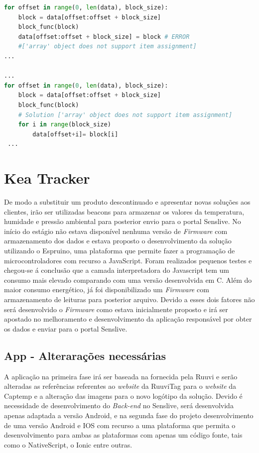 \begin{lstlisting}[caption=Adapatação do Código para o equipamento Digi,label={py2},language=Python]
for offset in range(0, len(data), block_size):
    block = data[offset:offset + block_size]
    block_func(block)
    data[offset:offset + block_size] = block # ERROR 
    #['array' object does not support item assignment]
...

...
for offset in range(0, len(data), block_size):
    block = data[offset:offset + block_size]
    block_func(block)
    # Solution ['array' object does not support item assignment]
    for i in range(block_size)
        data[offset+i]= block[i]
 ...
\end{lstlisting}

\section {Kea Tracker}

\par De modo a substituir um produto descontinuado e apresentar novas soluções aos clientes, irão ser utilizadas beacons para armazenar os valores da temperatura, humidade e pressão ambiental para posterior envio para o portal Senslive. No início do estágio não estava disponível nenhuma versão de \textit{Firmware} com armazenamento dos dados e estava proposto o desenvolvimento da solução utilizando o Espruino, uma plataforma que permite fazer a programação de microcontroladores com recurso a JavaScript. Foram realizados pequenos testes e chegou-se á conclusão que a camada interpretadora do Javascript tem um consumo mais elevado comparando com uma versão desenvolvida em C. Além do maior consumo energético, já foi disponibilizado um \textit{Firmware} com armazenamento de leituras para posterior arquivo. Devido a esses dois fatores não será desenvolvido o \textit{Firmware} como estava inicialmente proposto e irá ser apostado no melhoramento e desenvolvimento da aplicação responsável por obter os dados e enviar para o portal Senslive. 


\subsection{App - Alterarações necessárias}

\par A aplicação na primeira fase irá ser baseada na fornecida pela Ruuvi e serão alteradas as referências referentes ao \textit{website} da RuuviTag para o \textit{website} da Captemp e a alteração das imagens para o novo logótipo da solução. Devido é necessidade de desenvolvimento do \textit{Back-end} no Senslive, será desenvolvida apenas adaptada a versão Android, e na segunda fase do projeto desenvolvimento de uma versão Android e IOS com recurso a uma plataforma que permita o desenvolvimento para ambas as plataformas com apenas um código fonte, tais como o NativeScript\cite{nativescript}, o Ionic\cite{ionic} entre outras.

